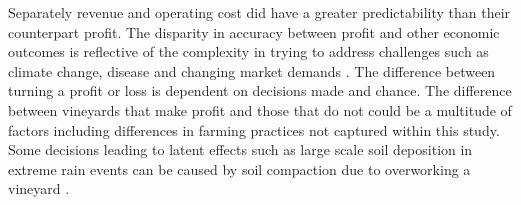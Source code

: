 \documentclass[review,12pt,authoryear]{elsarticle}
\begin{document}
\begin{linenumbers}
Separately revenue and operating cost did have a greater predictability than their counterpart profit. The disparity in accuracy between profit and other economic outcomes is reflective of the complexity in trying to address challenges such as climate change, disease and changing market demands \citep{wineaustraliaNationalVintageReport2020,wineaustraliaNationalVintageReport2021,wineaustraliaNationalVintageReport2022}. The difference between turning a profit or loss is dependent on decisions made and chance. The difference between vineyards that make profit and those that do not could be a multitude of factors including differences in farming practices not captured within this study. Some decisions leading to latent effects such as large scale soil deposition in extreme rain events can be caused by soil compaction due to overworking a vineyard \citep{capelloPermanentCoverSoil2020}. 

\iffalse





\end{linenumbers}
\end{document}
